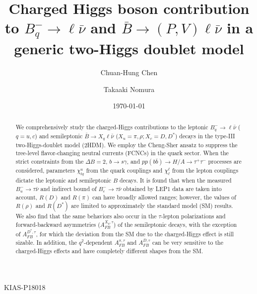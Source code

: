 \documentclass[prd,preprint,superscriptaddress,amsmath,amssymb]{revtex4}
\begin{document}
{\begin{flushright}{KIAS-P18018}
\end{flushright}}

\title{\bf \Large Charged Higgs boson contribution to  $B^-_{q} \to \ell \bar \nu$ and $\bar B\to (P, V) \ell \bar\nu$ in a generic two-Higgs doublet model}

\author{Chuan-Hung Chen}

\author{Takaaki Nomura}



\date{\today}

\begin{abstract}
We comprehensively study the charged-Higgs contributions to the leptonic $B^-_q \to \ell \bar \nu$ ($q=u,c$) and semileptonic $\bar B \to X_q \ell \bar\nu$ ($X_u=\pi, \rho; X_c=D,D^*$) decays in the type-III two-Higgs-doublet model (2HDM). We employ the Cheng-Sher ansatz to  suppress the tree-level flavor-changing neutral currents (FCNCs) in the quark sector. When the strict constraints from the $\Delta B=2$, $b\to s \gamma$, and $pp(b\bar b)\to H/A \to \tau^+ \tau^-$ processes are considered,  parameters $\chi^u_{tq}$ from the quark couplings and $\chi^\ell_\ell$  from the lepton couplings dictate the leptonic and semileptonic $B$ decays. It is found that when the measured $B^-_u\to \tau \bar \nu$ and indirect bound of $B^-_c \to \tau \bar \nu$ obtained by LEP1 data are taken into account, $R(D)$ and $R(\pi)$ can have broadly allowed ranges; however,  the values of $R(\rho)$ and $R(D^*)$ are limited to  approximately the standard model (SM) results.  We also find that the same behaviors also occur in the $\tau$-lepton polarizations and forward-backward asymmetries ($A^{X_q,\tau}_{FB}$) of the semileptonic decays, with the exception of $A^{D^*,\tau}_{FB}$, for which the deviation from the SM due to the charged-Higgs effect is still sizable.  In addition, the $q^2$-dependent $A^{\pi,\tau}_{FB}$ and $A^{D,\tau}_{FB}$ can be very sensitive to the charged-Higgs effects and have completely different shapes from the SM. 


\end{abstract}

\maketitle
\end{document}
